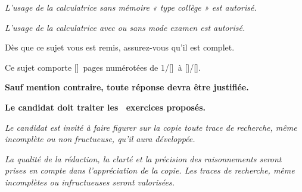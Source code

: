 {{\begin{center}
{				\medskip
				
				\textit{L’usage de la calculatrice sans mémoire « type collège » est autorisé.}
			}%
			{%
				\textit{L’usage de la calculatrice avec ou sans mode examen est autorisé.}
			}%
		\vspace*{10mm}
		
		Dès que ce sujet vous est remis, assurez-vous qu’il est complet.
		
		\smallskip
		
		Ce sujet comporte [\packlastpage]\ pages numérotées de 1/[\packlastpage]\ à [\packlastpage]/[\packlastpage].
	\end{center}
	\begin{center}
		\parbox{\useKV[EnteteSujetBac]{LargeurPar}}{%
			{%
				\vspace*{10mm}
				
				\noindent\textbf{Sauf mention contraire, toute réponse devra être justifiée.}
			}%
			{}%
			{%
				\vspace*{5mm}
				
				\noindent\textbf{Le candidat doit traiter les \ exercices proposés.}
			}%
			{}%
			{%
				\vspace*{10mm}
				
				\noindent\textit{Le candidat est invité à faire figurer sur la copie toute trace de recherche, même incomplète ou non fructueuse, qu’il aura développée.}
			}%
			{}%
			{%
				\vspace*{2mm}
				
				\noindent\textit{La qualité de la rédaction, la clarté et la précision des raisonnements seront prises en compte dans l’appréciation de la copie. Les traces de recherche, même incomplètes ou infructueuses seront valorisées.}
			}%
			{}%
		}%
	\end{center}%
	}%
	\pagebreak
}

\endinput